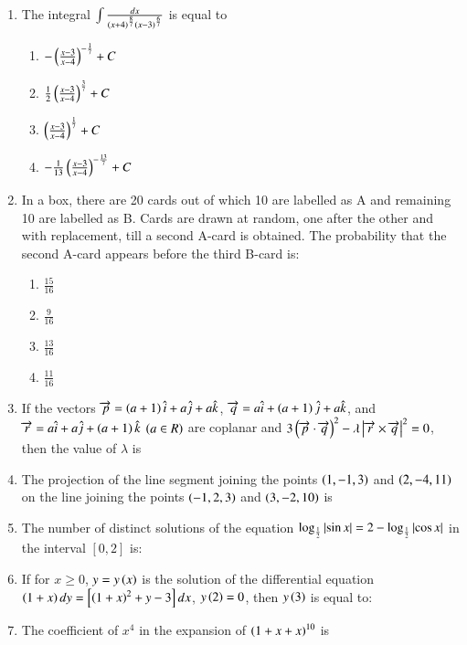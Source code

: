 \documentclass[journal,9pt,onecolumn]{IEEEtran}
\begin{document}
\begin{enumerate}
    \item The integral $\int\frac{dx}{\left(x+4\right)^{\frac{8}{7}}\left(x-3\right)^{\frac{6}{7}}}$ is equal to

		\begin{multicols}{2}
			\begin{enumerate}
				\item $-\left(\frac{x-3}{x-4}\right)^{-\frac{1}{7}}+C$
				\item $\frac{1}{2}\left(\frac{x-3}{x-4}\right)^{\frac{3}{7}}+C$
				\item $\left(\frac{x-3}{x-4}\right)^{\frac{1}{7}}+C$
				\item $-\frac{1}{13}\left(\frac{x-3}{x-4}\right)^{-\frac{13}{7}}+C$
			\end{enumerate}
		\end{multicols}

    \item In a box, there are 20 cards out of which 10 are labelled as A and remaining 10 are labelled as B. Cards are drawn at random, one after the other and with replacement, till a second A-card is obtained. The probability that the second A-card appears before the third B-card is:

		\begin{multicols}{4}
			\begin{enumerate}
				\item $\frac{15}{16}$
				\item $\frac{9}{16}$
				\item $\frac{13}{16}$
				\item $\frac{11}{16}$
			\end{enumerate}
		\end{multicols}

    \item If the vectors $\overrightarrow{p} = \left(a+1\right)\hat{i}+a\hat{j}+a\hat{k}$, $\overrightarrow{q} = a\hat{i}+\left(a+1\right)\hat{j}+a\hat{k}$, and $\overrightarrow{r} = a\hat{i}+a\hat{j}+\left(a+1\right)\hat{k}$ $\left(a\in R\right)$ are coplanar and $3\left(\overrightarrow{p}\cdot\overrightarrow{q}\right)^2 - \lambda\left\vert\overrightarrow{r}\times \overrightarrow{q}\right\vert^2=0$, then the value of $\lambda$ is

    \item The projection of the line segment joining the points $\left(1,-1,3\right)$ and $\left(2,-4,11\right)$ on the line joining the points $\left(-1,2,3\right)$ and $\left(3,-2,10\right)$ is
		
    \item The number of distinct solutions of the equation $\log_{\frac{1}{2}}\left\vert\sin x\right\vert = 2-\log_{\frac{1}{2}}\left\vert\cos x\right\vert$ in the interval $\left[0, 2\right]$ is:

    \item If for $x\geq 0$, $y=y\left(x\right)$ is the solution of the differential equation $\left(1+x\right)dy=\left[ \left(1+x\right)^2 +y-3\right]dx$, $y\left(2\right)=0$, then $y\left(3\right)$ is equal to:
	
    \item The coefficient of $x^4$ in the expansion of $\left(1+x+x\right)^{10}$ is

\end{enumerate}
\end{document}
